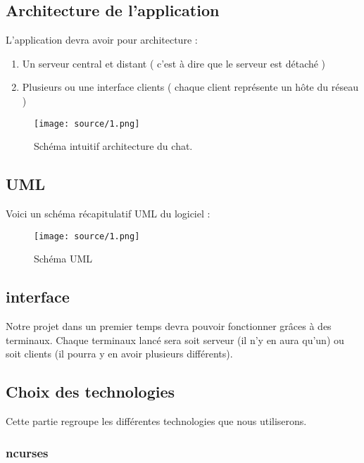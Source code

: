 \documentclass[a4paper 14pt]{article}
\begin{document}
\subsection{Architecture de l'application}

L'application devra avoir pour architecture : 

\begin{enumerate}
	\item Un serveur central et distant ( c'est à dire que le serveur est détaché )
	\item Plusieurs ou une interface clients ( chaque client représente un hôte du réseau )
\end{enumerate}

\begin{figure}[h]
   \texttt{[image: source/1.png]}
	\caption{Schéma intuitif architecture du chat.}
\end{figure}

\newpage

\subsection{UML}

Voici un schéma récapitulatif UML du logiciel :

\begin{figure}[h]
   \texttt{[image: source/1.png]}
	\caption{Schéma UML}
\end{figure}

\subsection{interface}

Notre projet dans un premier temps devra pouvoir fonctionner grâces à des terminaux.
Chaque terminaux lancé sera soit serveur (il n'y en aura qu'un) ou soit clients (il pourra y en avoir plusieurs différents).

\subsection{Choix des technologies}

Cette partie regroupe les différentes technologies que nous utiliserons.

\subsubsection{ncurses}
\end{document}
